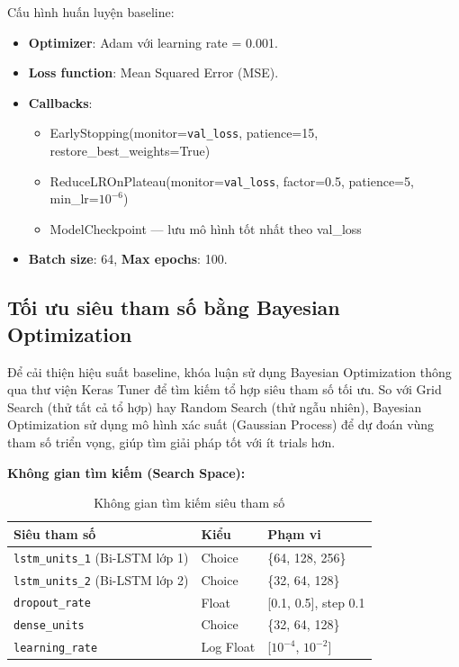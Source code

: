 Cấu hình huấn luyện baseline:
\begin{itemize}
    \item \textbf{Optimizer}: Adam \cite{kingma2014adam} với learning rate = 0.001.
    \item \textbf{Loss function}: Mean Squared Error (MSE).
    \item \textbf{Callbacks}:
    \begin{itemize}
        \item EarlyStopping(monitor=\texttt{val\_loss}, patience=15, restore\_best\_weights=True)
        \item ReduceLROnPlateau(monitor=\texttt{val\_loss}, factor=0.5, patience=5, min\_lr=$10^{-6}$)
        \item ModelCheckpoint — lưu mô hình tốt nhất theo val\_loss
    \end{itemize}
    \item \textbf{Batch size}: 64, \textbf{Max epochs}: 100.
\end{itemize}

\subsection{Tối ưu siêu tham số bằng Bayesian Optimization}
\label{subsec:bayesian_optimization}

Để cải thiện hiệu suất baseline, khóa luận sử dụng Bayesian Optimization \cite{snoek2012practical} thông qua thư viện Keras Tuner \cite{omalley2019kerastuner} để tìm kiếm tổ hợp siêu tham số tối ưu. So với Grid Search (thử tất cả tổ hợp) hay Random Search \cite{bergstra2012random} (thử ngẫu nhiên), Bayesian Optimization sử dụng mô hình xác suất (Gaussian Process) để dự đoán vùng tham số triển vọng, giúp tìm giải pháp tốt với ít trials hơn.

\textbf{Không gian tìm kiếm (Search Space):}

\begin{table}[H]
\centering
\caption{Không gian tìm kiếm siêu tham số}
\label{tab:search_space}
\small
\begin{tabular}{|l|l|l|}
\hline
\textbf{Siêu tham số} & \textbf{Kiểu} & \textbf{Phạm vi} \\
\hline
\texttt{lstm\_units\_1} (Bi-LSTM lớp 1) & Choice    & \{64, 128, 256\} \\
\texttt{lstm\_units\_2} (Bi-LSTM lớp 2) & Choice    & \{32, 64, 128\} \\
\texttt{dropout\_rate}                  & Float     & [0.1, 0.5], step 0.1 \\
\texttt{dense\_units}                   & Choice    & \{32, 64, 128\} \\
\texttt{learning\_rate}                 & Log Float & [$10^{-4}$, $10^{-2}$] \\
\hline
\end{tabular}
\end{table}

